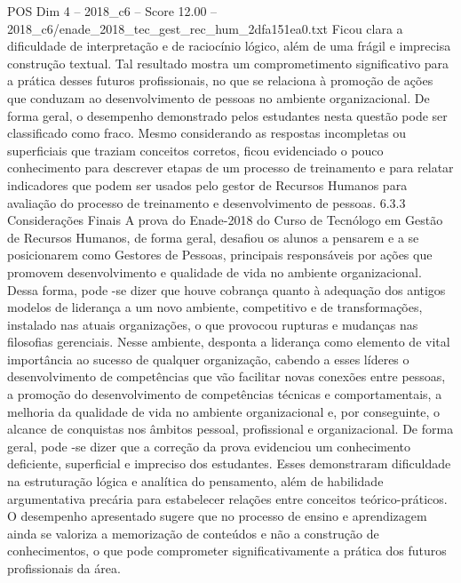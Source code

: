 \begin{textsample}{POS Dim 4 – 2018\_c6 – Score 12.00 – 2018\_c6/enade\_2018\_tec\_gest\_rec\_hum\_2dfa151ea0.txt}
Ficou clara a dificuldade de interpretação e de raciocínio lógico, além de uma frágil e imprecisa construção textual.
Tal resultado mostra um comprometimento significativo para a prática desses futuros profissionais, no que se relaciona à promoção de ações que conduzam ao desenvolvimento de pessoas no ambiente organizacional.
De forma geral, o desempenho demonstrado pelos estudantes nesta questão pode ser classificado como fraco.
Mesmo considerando as respostas incompletas ou superficiais que traziam conceitos corretos, ficou evidenciado o pouco conhecimento para descrever etapas de um processo de treinamento e para relatar indicadores que podem ser usados pelo gestor de Recursos Humanos para avaliação do processo de treinamento e desenvolvimento de pessoas. 6.3.3 Considerações Finais A prova do Enade-2018 do Curso de Tecnólogo em Gestão de Recursos Humanos, de forma geral, desafiou os alunos a pensarem e a se posicionarem como Gestores de Pessoas, principais responsáveis por ações que promovem desenvolvimento e qualidade de vida no ambiente organizacional.
Dessa forma, pode -se dizer que houve cobrança quanto à adequação dos antigos modelos de liderança a um novo ambiente, competitivo e de transformações, instalado nas atuais organizações, o que provocou rupturas e mudanças nas filosofias gerenciais.
Nesse ambiente, desponta a liderança como elemento de vital importância ao sucesso de qualquer organização, cabendo a esses líderes o desenvolvimento de competências que vão facilitar novas conexões entre pessoas, a promoção do desenvolvimento de competências técnicas e comportamentais, a melhoria da qualidade de vida no ambiente organizacional e, por conseguinte, o alcance de conquistas nos âmbitos pessoal, profissional e organizacional.
De forma geral, pode -se dizer que a correção da prova evidenciou um conhecimento deficiente, superficial e impreciso dos estudantes.
Esses demonstraram dificuldade na estruturação lógica e analítica do pensamento, além de habilidade argumentativa precária para estabelecer relações entre conceitos teórico-práticos.
O desempenho apresentado sugere que no processo de ensino e aprendizagem ainda se valoriza a memorização de conteúdos e não a construção de conhecimentos, o que pode comprometer significativamente a prática dos futuros profissionais da área.

\end{textsample}
